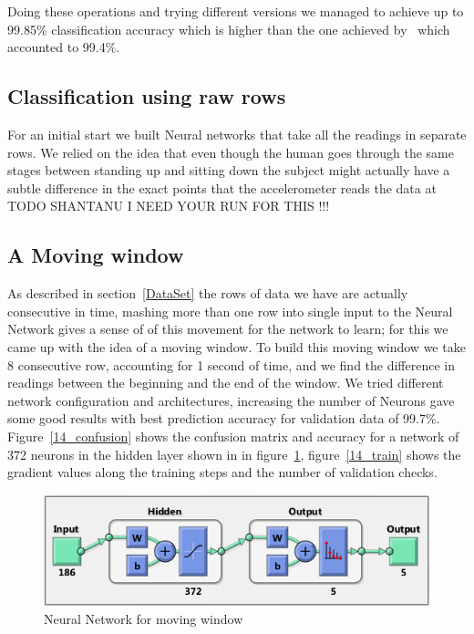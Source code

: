 \documentclass{article}
\begin{document}
Doing these operations and trying different versions we managed to achieve up to 99.85\% classification accuracy which is higher 
than the one achieved by~\cite{ugulino2012wearable} which accounted to 99.4\%. 


\subsection{Classification using raw rows}
\label{simple_rows}
For an initial start we built Neural networks that take all the readings in separate rows. We relied on the idea that even though the
human goes through the same stages between standing up and sitting down the subject might actually have a subtle difference in the exact
points that the accelerometer reads the data at TODO SHANTANU I NEED YOUR RUN FOR THIS !!!

\subsection{A Moving window}
\label{consecutive_rows}
As described in section~\ref{DataSet} the rows of data we have are actually consecutive in time, mashing more than one row into single input
to the Neural Network gives a sense of of this movement for the network to learn; for this we came up with the idea of a moving window.
To build this moving window we take 8 consecutive row, accounting for 1 second of time, and we find the difference in readings between the 
beginning and the end of the window. We tried different network configuration and architectures, increasing the number of Neurons gave some
good results with best prediction accuracy for validation data of 99.7\%. Figure~\ref{14_confusion} shows the confusion matrix and 
accuracy for a network of 372 neurons in the hidden layer shown in in figure~\ref{14_net}, figure~\ref{14_train} shows the gradient values 
along the training steps and the number of validation checks.
\begin{figure}
\includegraphics{14_net}
\caption{Neural Network for moving window}
\label{14_net}
\end{figure}
\end{document}
